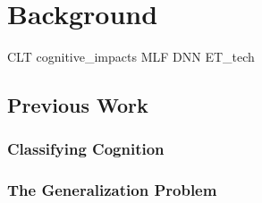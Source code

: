 \chapter{Background}

{CLT}
{cognitive_impacts}
{MLF}
{DNN}
{ET_tech}

\section{Previous Work}
\subsection{Classifying Cognition}
\subsection{The Generalization Problem}